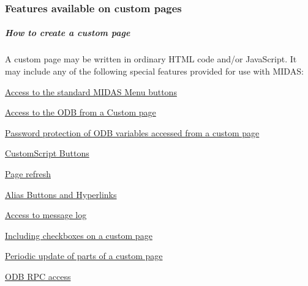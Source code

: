  \subsubsection{Features available on custom pages}\label{RC_mhttpd_custom_features}
\par
 

\label{RC_mhttpd_custom_features_mhttpd_page_custom_create}
\hypertarget{RC_mhttpd_custom_features_mhttpd_page_custom_create}{}
 \hypertarget{RC_mhttpd_custom_features_RC_mhttpd_custom_create}{}\subparagraph{How to create a custom page}\label{RC_mhttpd_custom_features_RC_mhttpd_custom_create}
A custom page may be written in ordinary HTML code and/or JavaScript. It may include any of the following special features provided for use with MIDAS:

\label{RC_mhttpd_custom_features_idx_mhttpd_page_custom_features}
\hypertarget{RC_mhttpd_custom_features_idx_mhttpd_page_custom_features}{}



\begin{DoxyItemize}
\item \hyperlink{RC_mhttpd_custom_features_RC_mhttpd_custom_midas_buttons}{Access to the standard MIDAS Menu buttons}
\item \hyperlink{RC_mhttpd_custom_ODB_access}{Access to the ODB from a Custom page}
\item \hyperlink{RC_mhttpd_custom_ODB_access_features_RC_mhttpd_custom_pw_protection}{Password protection of ODB variables accessed from a custom page}
\item \hyperlink{RC_mhttpd_custom_features_RC_mhttpd_custom_script_buttons}{CustomScript Buttons}
\item \hyperlink{RC_mhttpd_custom_features_RC_mhttpd_custom_refresh}{Page refresh}
\item \hyperlink{RC_mhttpd_custom_features_RC_mhttpd_custom_alias}{Alias Buttons and Hyperlinks}
\item \hyperlink{RC_mhttpd_custom_features_RC_mhttpd_custom_getmsg}{Access to message log}
\item \hyperlink{RC_mhttpd_custom_ODB_access_features_RC_mhttpd_custom_checkboxes}{Including checkboxes on a custom page}
\item \hyperlink{RC_mhttpd_custom_ODB_access_features_RC_mhttpd_js_update_part}{Periodic update of parts of a custom page}
\item \hyperlink{RC_mhttpd_custom_RPC_access}{ODB RPC access}
\end{DoxyItemize}



